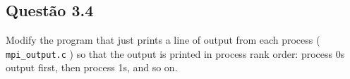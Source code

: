 

\subsection{Questão 3.4}

Modify the program that just prints a line of output from each process
( \texttt{mpi\_output.c} ) so that the output is printed in process rank order: process 0s output first, then process 1s, and so on.\\



